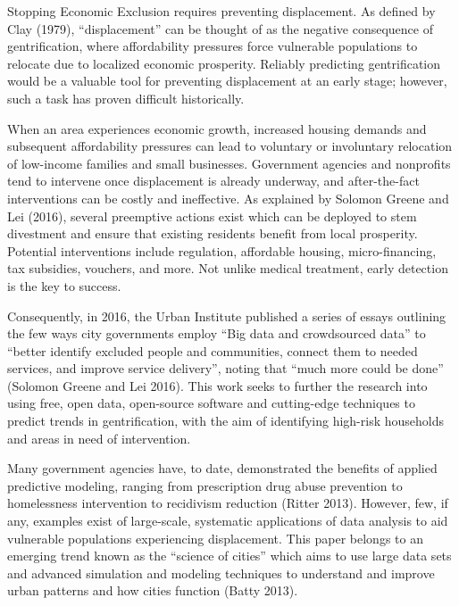 \documentclass[12pt,]{article}
\begin{document}
Stopping Economic Exclusion requires preventing displacement. As defined
by Clay (1979), ``displacement'' can be thought of as the negative
consequence of gentrification, where affordability pressures force
vulnerable populations to relocate due to localized economic prosperity.
Reliably predicting gentrification would be a valuable tool for
preventing displacement at an early stage; however, such a task has
proven difficult historically.

When an area experiences economic growth, increased housing demands and
subsequent affordability pressures can lead to voluntary or involuntary
relocation of low-income families and small businesses. Government
agencies and nonprofits tend to intervene once displacement is already
underway, and after-the-fact interventions can be costly and
ineffective. As explained by Solomon Greene and Lei (2016), several
preemptive actions exist which can be deployed to stem divestment and
ensure that existing residents benefit from local prosperity. Potential
interventions include regulation, affordable housing, micro-financing,
tax subsidies, vouchers, and more. Not unlike medical treatment, early
detection is the key to success.

Consequently, in 2016, the Urban Institute published a series of essays
outlining the few ways city governments employ ``Big data and
crowdsourced data'' to ``better identify excluded people and
communities, connect them to needed services, and improve service
delivery'', noting that ``much more could be done'' (Solomon Greene and
Lei 2016). This work seeks to further the research into using free, open
data, open-source software and cutting-edge techniques to predict trends
in gentrification, with the aim of identifying high-risk households and
areas in need of intervention.

Many government agencies have, to date, demonstrated the benefits of
applied predictive modeling, ranging from prescription drug abuse
prevention to homelessness intervention to recidivism reduction (Ritter
2013). However, few, if any, examples exist of large-scale, systematic
applications of data analysis to aid vulnerable populations experiencing
displacement. This paper belongs to an emerging trend known as the
``science of cities'' which aims to use large data sets and advanced
simulation and modeling techniques to understand and improve urban
patterns and how cities function (Batty 2013).
\end{document}
